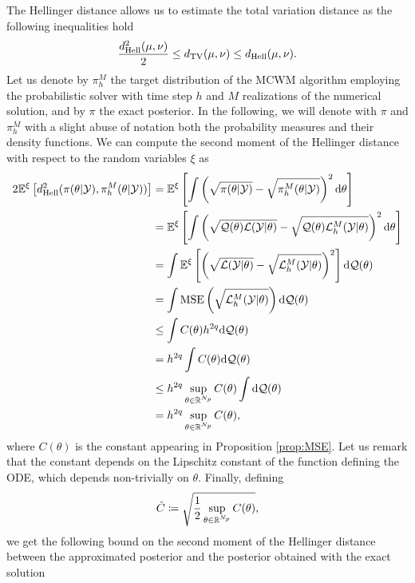 \noindent The Hellinger distance allows us to estimate the total variation distance as the following inequalities hold \cite{GiS02}
\begin{equation}\label{eq:TVvsHell}
	\frac{d_{\mathrm{Hell}}^2(\mu, \nu)}{2} \leq d_{\mathrm{TV}}(\mu, \nu) \leq d_{\mathrm{Hell}}(\mu, \nu).
\end{equation}
Let us denote by $\pi_h^M$ the target distribution of the MCWM algorithm employing the probabilistic solver with time step $h$ and $M$ realizations of the numerical solution, and by $\pi$ the exact posterior. In the following, we will denote with $\pi$ and $\pi_h^M$ with a slight abuse of notation both the probability measures and their density functions. We can compute the second moment of the Hellinger distance with respect to the random variables $\xi$ as
\begin{equation}
\begin{aligned}
2\mathbb{E}^\xi\left[d_{\mathrm{Hell}}^2(\pi(\theta|\mathcal{Y}),\pi^M_h(\theta|\mathcal{Y}))\right] &= \mathbb{E}^\xi\left[\int \left(\sqrt{\pi(\theta|\mathcal{Y})} - \sqrt{\pi^M_h(\theta|\mathcal{Y})}\right)^2 \dd \theta\right] \\
&= \mathbb{E}^\xi\left[\int \left(\sqrt{\mathcal{Q}(\theta) \mathcal{L}(\mathcal{Y}|\theta)} - \sqrt{\mathcal{Q}(\theta) \mathcal{L}^M_h(\mathcal{Y}|\theta)}\right)^2 \dd \theta \right]\\
&= \int \mathbb{E}^\xi\left[\left(\sqrt{\mathcal{L}(\mathcal{Y}|\theta)} - \sqrt{\mathcal{L}^M_h(\mathcal{Y}|\theta)}\right)^2\right] \dd \mathcal{Q}(\theta)  \\
&= \int \operatorname{MSE}\left(\sqrt{\mathcal{L}^M_h(\mathcal Y|\theta)}\right) \dd \mathcal{Q}(\theta) \\
&\leq \int C(\theta)h^{2q} \dd \mathcal{Q}(\theta) \\
&= h^{2q} \int C(\theta) \dd \mathcal{Q}(\theta) \\
&\leq h^{2q} \sup_{\theta \in \mathbb{R}^{N_p}} C(\theta) \int \dd\mathcal{Q}(\theta) \\
&= h^{2q} \sup_{\theta \in \mathbb{R}^{N_p}} C(\theta),
\end{aligned}
\end{equation}
where $C(\theta)$ is the constant appearing in Proposition \ref{prop:MSE}. Let us remark that the constant depends on the Lipschitz constant of the function defining the ODE, which depends non-trivially on $\theta$. Finally, defining 
\begin{equation}
	\tilde C \coloneqq \sqrt{\frac{1}{2} \sup_{\theta \in \mathbb{R}^{N_p}} C(\theta)}, 
\end{equation}
we get the following bound on the second moment of the Hellinger distance between the approximated posterior and the posterior obtained with the exact solution 
